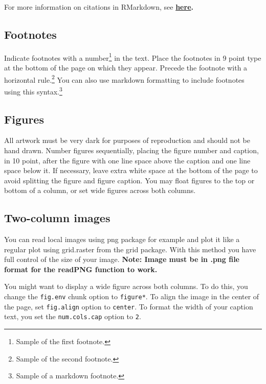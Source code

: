 \documentclass[10pt, letterpaper]{article}
\begin{document}
For more information on citations in RMarkdown, see
\textbf{\href{http://rmarkdown.rstudio.com/authoring_bibliographies_and_citations.html\#citations}{here}.}

\subsection{Footnotes}\label{footnotes}

Indicate footnotes with a number\footnote{Sample of the first
footnote.} in the text. Place the footnotes in 9 point type at the
bottom of the page on which they appear. Precede the footnote with a
horizontal rule.\footnote{Sample of the second footnote.} You can also
use markdown formatting to include footnotes using this
syntax.\footnote{Sample of a markdown footnote.}

\subsection{Figures}\label{figures}

All artwork must be very dark for purposes of reproduction and should
not be hand drawn. Number figures sequentially, placing the figure
number and caption, in 10 point, after the figure with one line space
above the caption and one line space below it. If necessary, leave extra
white space at the bottom of the page to avoid splitting the figure and
figure caption. You may float figures to the top or bottom of a column,
or set wide figures across both columns.

\subsection{Two-column images}\label{two-column-images}

You can read local images using png package for example and plot it like
a regular plot using grid.raster from the grid package. With this method
you have full control of the size of your image. \textbf{Note: Image
must be in .png file format for the readPNG function to work.}

You might want to display a wide figure across both columns. To do this,
you change the \texttt{fig.env} chunk option to \texttt{figure*}. To
align the image in the center of the page, set \texttt{fig.align} option
to \texttt{center}. To format the width of your caption text, you set
the \texttt{num.cols.cap} option to \texttt{2}.
\end{document}
